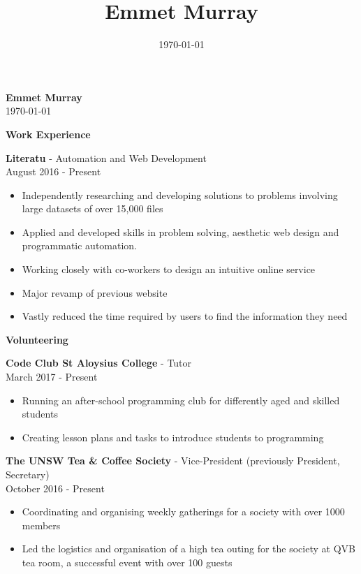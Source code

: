 \documentclass{article}
\title{\textbf{Emmet Murray}}
\date{\today}
\newcommand{\minititle}[1]{\begin{center}\textbf{#1} \end{center} \vspace{0.2cm}}
\newcommand{\resumeEntry}[3]{{\large \textbf{#1} - #2} \\ \small{#3}}
\begin{document}
 

\begin{minipage}[t]{0.6\linewidth}   
    \begin{center}
        { \huge \textbf{Emmet Murray}} \\
        \vspace{0.5cm}
        \today
    \end{center}
    {
        \minititle{Work Experience}
        \resumeEntry{Literatu}{Automation and Web Development}{August 2016 - Present}
        \begin{itemize}
            \setlength\itemsep{0.05cm}
            \item Independently researching and developing solutions to problems involving large datasets of over 15,000 files
            \item Applied and developed skills in problem solving, aesthetic web design and programmatic automation.
            \item Working closely with co-workers to design an intuitive online service
            \item Major revamp of previous website
            \item Vastly reduced the time required by users to find the information they need
        \end{itemize}
    }
    {
        \vspace{0.2cm}
        \minititle{Volunteering}
        \resumeEntry{Code Club St Aloysius College}{Tutor}{March 2017 - Present}
        \begin{itemize}
            \setlength\itemsep{0.05cm}
            \item Running an after-school programming club for differently aged and skilled students
            \item Creating lesson plans and tasks to introduce students to programming
        \end{itemize}
        \vspace{0.4cm}
        \resumeEntry{The UNSW Tea \& Coffee Society}{Vice-President (previously President, Secretary)}{October 2016 - Present}
        \begin{itemize}
            \setlength\itemsep{0.05cm}
            \item Coordinating and organising weekly gatherings for a society with over 1000 members 
            \item Led the logistics and organisation of a high tea outing for the society at QVB tea room, a successful event with over 100 guests

\end{itemize}}
\end{minipage}
\end{document}
